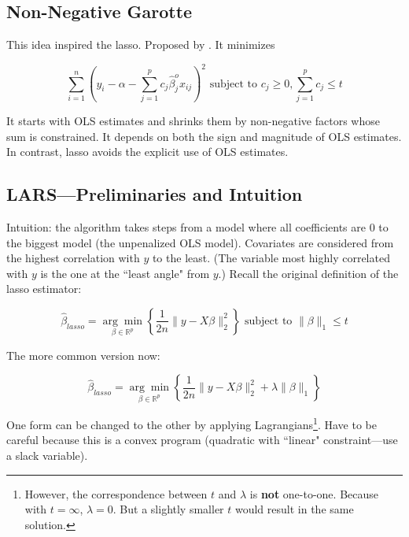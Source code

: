 \subsection{Non-Negative Garotte}

This idea inspired the lasso. Proposed by \citet{Breiman1995}. It minimizes

\[
\sum_{i=1}^n \left(y_i - \alpha - \sum_{j=1}^p c_j \hat{\beta}_j^o x_{ij} \right)^2 \text{ subject to } c_j \geq 0, \sum_{j=1}^p c_j \leq t
\]

It starts with OLS estimates and shrinks them by non-negative factors whose sum is constrained. It depends on both the sign and magnitude of OLS estimates. In contrast, lasso avoids the explicit use of OLS estimates.

\subsection{LARS---Preliminaries and Intuition}\label{lars.prelims}

Intuition: the algorithm takes steps from a model where all coefficients are 0 to the biggest model (the unpenalized OLS model). Covariates are considered from the highest correlation with \(y\) to the least. (The variable most highly correlated with \(y\) is the one at the ``least angle" from \(y\).) Recall the original definition of the lasso estimator:

\begin{equation}\label{linreg.lasso.constrained}
\hat{\beta}_{lasso} = \underset{\beta \in \mathbb{R}^p}{\arg \min}\left\{ \frac{1}{2n}\lVert y - X \beta \rVert_2^2 \right\} \text{ subject to } \lVert \beta \rVert_1 \leq t
\end{equation}

The more common version now:

\begin{equation}\label{linreg.lasso.lagrangian}
\hat{\beta}_{lasso} =\underset{\beta \in \mathbb{R}^p}{\arg \min} \left\{ \frac{1}{2n}\lVert y - X \beta \rVert_2^2   + \lambda \lVert \beta \rVert_1 \right\}
\end{equation}

One form can be changed to the other by applying Lagrangians\footnote{However, the correspondence between \(t\) and \(\lambda\) is \textbf{not} one-to-one. Because with \(t = \infty\), \(\lambda =0\). But a slightly smaller \(t\) would result in the same solution.}. Have to be careful because this is a convex program (quadratic with ``linear" constraint---use a slack variable). 

